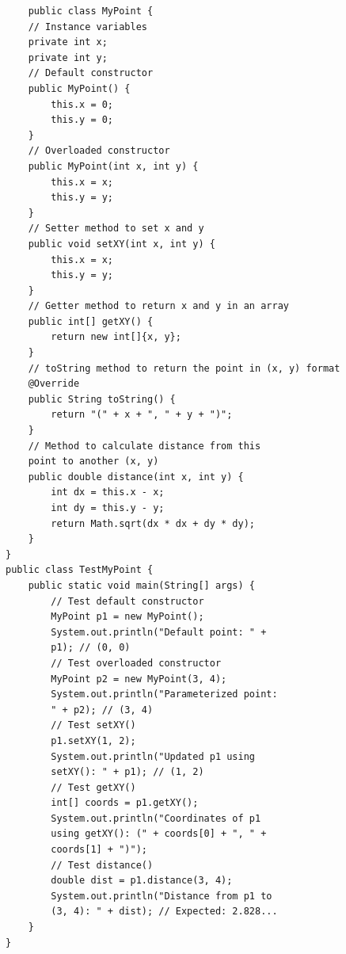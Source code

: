 \begin{verbatim}
    public class MyPoint {
    // Instance variables
    private int x;
    private int y;
    // Default constructor
    public MyPoint() {
        this.x = 0;
        this.y = 0;
    }
    // Overloaded constructor
    public MyPoint(int x, int y) {
        this.x = x;
        this.y = y;
    }
    // Setter method to set x and y
    public void setXY(int x, int y) {
        this.x = x;
        this.y = y;
    }
    // Getter method to return x and y in an array
    public int[] getXY() {
        return new int[]{x, y};
    }
    // toString method to return the point in (x, y) format
    @Override
    public String toString() {
        return "(" + x + ", " + y + ")";
    }
    // Method to calculate distance from this 
    point to another (x, y)
    public double distance(int x, int y) {
        int dx = this.x - x;
        int dy = this.y - y;
        return Math.sqrt(dx * dx + dy * dy);
    }
}
public class TestMyPoint {
    public static void main(String[] args) {
        // Test default constructor
        MyPoint p1 = new MyPoint();
        System.out.println("Default point: " + 
        p1); // (0, 0)
        // Test overloaded constructor
        MyPoint p2 = new MyPoint(3, 4);
        System.out.println("Parameterized point: 
        " + p2); // (3, 4)
        // Test setXY()
        p1.setXY(1, 2);
        System.out.println("Updated p1 using 
        setXY(): " + p1); // (1, 2)
        // Test getXY()
        int[] coords = p1.getXY();
        System.out.println("Coordinates of p1 
        using getXY(): (" + coords[0] + ", " + 
        coords[1] + ")");
        // Test distance()
        double dist = p1.distance(3, 4);
        System.out.println("Distance from p1 to 
        (3, 4): " + dist); // Expected: 2.828...
    }
}
\end{verbatim}